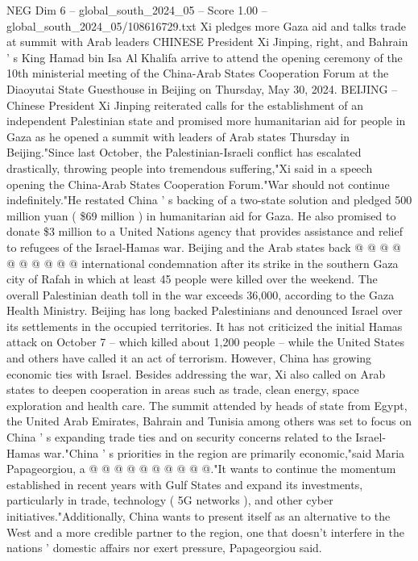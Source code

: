 \begin{textsample}{NEG Dim 6 – global\_south\_2024\_05 – Score 1.00 – global\_south\_2024\_05/108616729.txt}  \label{ex:f6_neg_294}
Xi pledges more Gaza aid and talks trade at summit with Arab leaders CHINESE President Xi Jinping, right, and Bahrain ' s King Hamad bin Isa Al Khalifa arrive to attend the opening ceremony of the 10th ministerial meeting of the China-Arab States Cooperation Forum at the Diaoyutai State Guesthouse in Beijing on Thursday, May 30, 2024.
BEIJING -- Chinese President Xi Jinping reiterated calls for the establishment of an independent Palestinian state and promised more humanitarian aid for people in Gaza as he opened a summit with leaders of Arab states Thursday in Beijing."Since last October, the Palestinian-Israeli conflict has escalated drastically, throwing people into tremendous suffering,"Xi said in a speech opening the China-Arab States Cooperation Forum."War should not continue indefinitely."He restated China ' s backing of a two-state solution and pledged 500 million yuan ( \$69 million ) in humanitarian aid for Gaza.
He also promised to donate \$3 million to a United Nations agency that provides assistance and relief to refugees of the Israel-Hamas war.
Beijing and the Arab states back @ @ @ @ @ @ @ @ @ @ international condemnation after its strike in the southern Gaza city of Rafah in which at least 45 people were killed over the weekend.
The overall Palestinian death toll in the war exceeds 36,000, according to the Gaza Health Ministry.
Beijing has long backed Palestinians and denounced Israel over its settlements in the occupied territories.
It has not criticized the initial Hamas attack on October 7 -- which killed about 1,200 people -- while the United States and others have called it an act of terrorism.
However, China has growing economic ties with Israel.
Besides addressing the war, Xi also called on Arab states to deepen cooperation in areas such as trade, clean energy, space exploration and health care.
The summit attended by heads of state from Egypt, the United Arab Emirates, Bahrain and Tunisia among others was set to focus on China ' s expanding trade ties and on security concerns related to the Israel-Hamas war."China ' s priorities in the region are primarily economic,"said Maria Papageorgiou, a @ @ @ @ @ @ @ @ @ @."It wants to continue the momentum established in recent years with Gulf States and expand its investments, particularly in trade, technology ( 5G networks ), and other cyber initiatives."Additionally, China wants to present itself as an alternative to the West and a more credible partner to the region, one that doesn't interfere in the nations ' domestic affairs nor exert pressure, Papageorgiou said.

\end{textsample}

